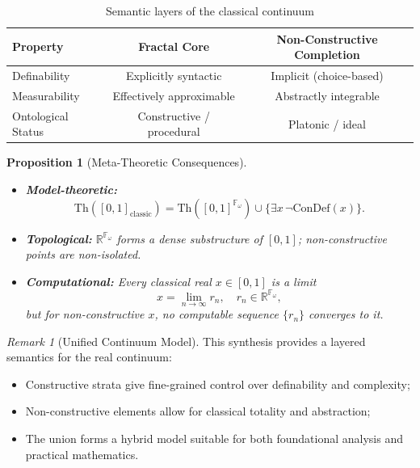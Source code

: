 \documentclass[12pt]{article}
\theoremstyle{definition}
\theoremstyle{plain}
\newtheorem{proposition}[definition]{Proposition}
\theoremstyle{remark}
\newtheorem*{remark}{Remark}
\begin{document}
\begin{table}[h]
\centering
\renewcommand{\arraystretch}{1.25}
\begin{tabular}{@{}|l|c|c|@{}}
\hline
\textbf{Property} & \textbf{Fractal Core} & \textbf{Non-Constructive Completion} \\ \hline
Definability & Explicitly syntactic & Implicit (choice-based) \\
Measurability & Effectively approximable & Abstractly integrable \\
Ontological Status & Constructive / procedural & Platonic / ideal \\ \hline
\end{tabular}
\caption{Semantic layers of the classical continuum}
\label{tab:semantic-continuum}
\end{table}

\begin{proposition}[Meta-Theoretic Consequences]
\leavevmode
\begin{itemize}
    \item \textbf{Model-theoretic:}
    \[
    \mathrm{Th}([0,1]_{\mathrm{classic}}) = \mathrm{Th}([0,1]^{\mathbb{F}_\omega}) \cup \{ \exists x\, \neg\mathrm{ConDef}(x) \}.
    \]

    \item \textbf{Topological:} \( \mathbb{R}^{\mathbb{F}_\omega} \) forms a dense substructure of \( [0,1] \); non-constructive points are non-isolated.

    \item \textbf{Computational:} Every classical real \( x \in [0,1] \) is a limit
    \[
    x = \lim_{n \to \infty} r_n, \quad r_n \in \mathbb{R}^{\mathbb{F}_\omega},
    \]
    but for non-constructive \( x \), no computable sequence \( \{r_n\} \) converges to it.
\end{itemize}
\end{proposition}

\begin{remark}[Unified Continuum Model]
This synthesis provides a layered semantics for the real continuum:
\begin{itemize}
    \item Constructive strata give fine-grained control over definability and complexity;
    \item Non-constructive elements allow for classical totality and abstraction;
    \item The union forms a hybrid model suitable for both foundational analysis and practical mathematics.
\end{itemize}
\end{remark}
\end{document}
